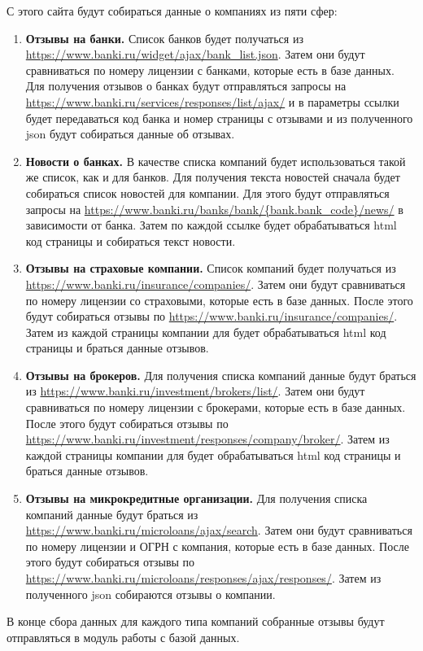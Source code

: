\documentclass{article}
\begin{document}
С этого сайта будут собираться данные о компаниях из пяти сфер:
\begin{enumerate}
\item \textbf{Отзывы на банки.}
Список банков будет получаться из \url{https://www.banki.ru/widget/ajax/bank\_list.json}. Затем они будут сравниваться по номеру лицензии с банками, которые есть в базе данных. Для получения отзывов о банках будут отправляться запросы на \url{https://www.banki.ru/services/responses/list/ajax/} и в параметры ссылки будет передаваться код банка и номер страницы с отзывами и из полученного json будут собираться данные об отзывах.
\item \textbf{Новости о банках.}
В качестве списка компаний будет использоваться такой же список, как и для банков. Для получения текста новостей сначала будет собираться список новостей для компании. Для этого будут отправляться запросы на \url{https://www.banki.ru/banks/bank/\{bank.bank\_code\}/news/} в зависимости от банка. Затем по каждой ссылке будет обрабатываться html код страницы и собираться текст новости.
\item \textbf{Отзывы на страховые компании.}
Список компаний будет получаться из \url{https://www.banki.ru/insurance/companies/}. Затем они будут сравниваться по номеру лицензии со страховыми, которые есть в базе данных. После этого будут собираться отзывы по \url{https://www.banki.ru/insurance/companies/}. Затем из каждой страницы компании для будет обрабатываться html код страницы и браться данные отзывов.
\item \textbf{Отзывы на брокеров.}
Для получения списка компаний данные будут браться из \url{https://www.banki.ru/investment/brokers/list/}. Затем они будут сравниваться по номеру лицензии с брокерами, которые есть в базе данных. После этого будут собираться отзывы по \url{https://www.banki.ru/investment/responses/company/broker/}. Затем из каждой страницы компании для будет обрабатываться html код страницы и браться данные отзывов.
\item \textbf{Отзывы на микрокредитные организации.}
Для получения списка компаний данные будут браться из \url{https://www.banki.ru/microloans/ajax/search}. Затем они будут сравниваться по номеру лицензии и ОГРН с компания, которые есть в базе данных. После этого будут собираться отзывы по \url{https://www.banki.ru/microloans/responses/ajax/responses/}. Затем из полученного json собираются отзывы о компании.
\end{enumerate}
В конце сбора данных для каждого типа компаний собранные отзывы будут отправляться в модуль работы с базой данных.
\end{document}
